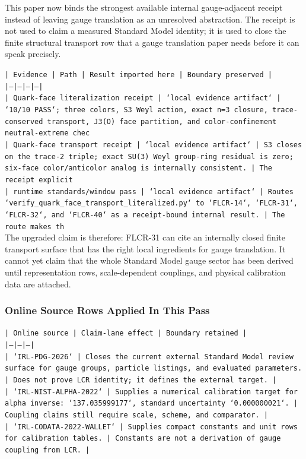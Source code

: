 \documentclass[11pt]{article}
\begin{document}
This paper now binds the strongest available internal gauge-adjacent receipt instead of leaving gauge translation as an unresolved abstraction. The receipt is not used to claim a measured Standard Model identity; it is used to close the finite structural transport row that a gauge translation paper needs before it can speak precisely.

\noindent\texttt{| Evidence | Path | Result imported here | Boundary preserved |}\\
\noindent\texttt{|---|---|---|---|}\\
\noindent\texttt{| Quark-face literalization receipt | `local evidence artifact` | `10/10 PASS`; three colors, S3 Weyl action, exact n=3 closure, trace-conserved transport, J3(O) face partition, and color-confinement neutral-extreme chec}\\
\noindent\texttt{| Quark-face transport receipt | `local evidence artifact` | S3 closes on the trace-2 triple; exact SU(3) Weyl group-ring residual is zero; six-face color/anticolor analog is internally consistent. | The receipt explicit}\\
\noindent\texttt{| runtime standards/window pass | `local evidence artifact` | Routes `verify\_quark\_face\_transport\_literalized.py` to `FLCR-14`, `FLCR-31`, `FLCR-32`, and `FLCR-40` as a receipt-bound internal result. | The route makes th}\\

The upgraded claim is therefore: FLCR-31 can cite an internally closed finite transport surface that has the right local ingredients for gauge translation. It cannot yet claim that the whole Standard Model gauge sector has been derived until representation rows, scale-dependent couplings, and physical calibration data are attached.

\subsubsection*{Online Source Rows Applied In This Pass}

\noindent\texttt{| Online source | Claim-lane effect | Boundary retained |}\\
\noindent\texttt{|---|---|---|}\\
\noindent\texttt{| `IRL-PDG-2026` | Closes the current external Standard Model review surface for gauge groups, particle listings, and evaluated parameters. | Does not prove LCR identity; it defines the external target. |}\\
\noindent\texttt{| `IRL-NIST-ALPHA-2022` | Supplies a numerical calibration target for alpha inverse: `137.035999177`, standard uncertainty `0.000000021`. | Coupling claims still require scale, scheme, and comparator. |}\\
\noindent\texttt{| `IRL-CODATA-2022-WALLET` | Supplies compact constants and unit rows for calibration tables. | Constants are not a derivation of gauge coupling from LCR. |}\\
\end{document}

